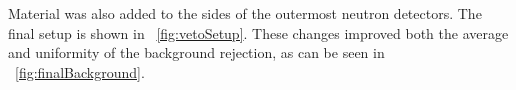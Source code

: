 Material was also added to the sides of the outermost neutron detectors.  The final setup is shown in {\fig}~\ref{fig:vetoSetup}.  These changes improved both the average and uniformity of the background rejection, as can be seen in {\fig}~\ref{fig:finalBackground}.
\begin{figure}[!htbp]
\centering
{}
\end{figure}

